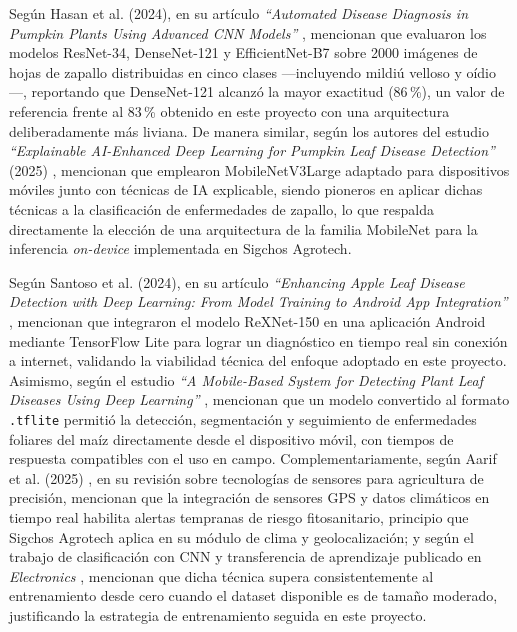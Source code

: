 \documentclass[12pt,a4paper]{article}
\begin{document}
Según Hasan et al. (2024), en su artículo \textit{``Automated Disease Diagnosis
in Pumpkin Plants Using Advanced CNN Models''} \cite{pumpkin2024}, mencionan que
evaluaron los modelos ResNet-34, DenseNet-121 y EfficientNet-B7 sobre 2000
imágenes de hojas de zapallo distribuidas en cinco clases —incluyendo mildiú
velloso y oídio—, reportando que DenseNet-121 alcanzó la mayor exactitud
(86\,\%), un valor de referencia frente al 83\,\% obtenido en este proyecto con
una arquitectura deliberadamente más liviana. De manera similar, según los
autores del estudio \textit{``Explainable AI-Enhanced Deep Learning for Pumpkin
Leaf Disease Detection''} (2025) \cite{pumpkinxai2025}, mencionan que emplearon
MobileNetV3Large adaptado para dispositivos móviles junto con técnicas de IA
explicable, siendo pioneros en aplicar dichas técnicas a la clasificación de
enfermedades de zapallo, lo que respalda directamente la elección de una
arquitectura de la familia MobileNet para la inferencia \textit{on-device}
implementada en Sigchos Agrotech.

Según Santoso et al. (2024), en su artículo \textit{``Enhancing Apple Leaf
Disease Detection with Deep Learning: From Model Training to Android App
Integration''} \cite{applemobile2024}, mencionan que integraron el modelo
ReXNet-150 en una aplicación Android mediante TensorFlow Lite para lograr un
diagnóstico en tiempo real sin conexión a internet, validando la viabilidad
técnica del enfoque adoptado en este proyecto. Asimismo, según el estudio
\textit{``A Mobile-Based System for Detecting Plant Leaf Diseases Using Deep
Learning''} \cite{maizemobile2023}, mencionan que un modelo convertido al formato
\texttt{.tflite} permitió la detección, segmentación y seguimiento de
enfermedades foliares del maíz directamente desde el dispositivo móvil, con
tiempos de respuesta compatibles con el uso en campo. Complementariamente, según
Aarif et al. (2025) \cite{precisionagro2025}, en su revisión sobre tecnologías de
sensores para agricultura de precisión, mencionan que la integración de sensores
GPS y datos climáticos en tiempo real habilita alertas tempranas de riesgo
fitosanitario, principio que Sigchos Agrotech aplica en su módulo de clima y
geolocalización; y según el trabajo de clasificación con CNN y transferencia de
aprendizaje publicado en \textit{Electronics} \cite{cnn2021transfer}, mencionan
que dicha técnica supera consistentemente al entrenamiento desde cero cuando el
dataset disponible es de tamaño moderado, justificando la estrategia de
entrenamiento seguida en este proyecto.
\end{document}
